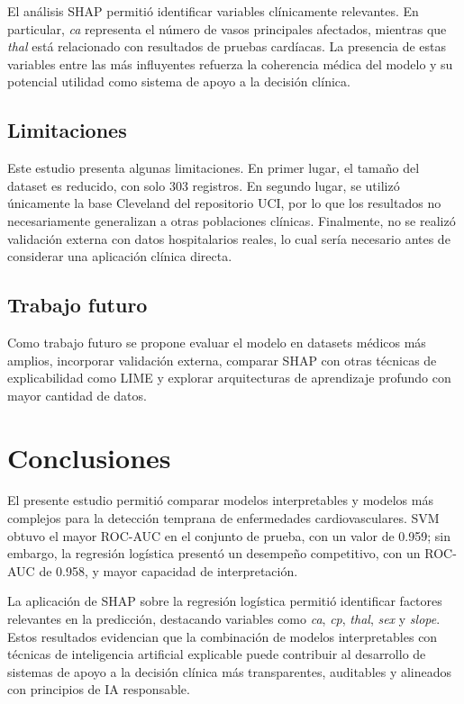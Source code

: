 \documentclass[conference]{IEEEtran}
\begin{document}
El análisis SHAP permitió identificar variables clínicamente relevantes. En particular, \textit{ca} representa el número de vasos principales afectados, mientras que \textit{thal} está relacionado con resultados de pruebas cardíacas. La presencia de estas variables entre las más influyentes refuerza la coherencia médica del modelo y su potencial utilidad como sistema de apoyo a la decisión clínica.

\subsection{Limitaciones}

Este estudio presenta algunas limitaciones. En primer lugar, el tamaño del dataset es reducido, con solo 303 registros. En segundo lugar, se utilizó únicamente la base Cleveland del repositorio UCI, por lo que los resultados no necesariamente generalizan a otras poblaciones clínicas. Finalmente, no se realizó validación externa con datos hospitalarios reales, lo cual sería necesario antes de considerar una aplicación clínica directa.

\subsection{Trabajo futuro}

Como trabajo futuro se propone evaluar el modelo en datasets médicos más amplios, incorporar validación externa, comparar SHAP con otras técnicas de explicabilidad como LIME y explorar arquitecturas de aprendizaje profundo con mayor cantidad de datos.

\section{Conclusiones}

El presente estudio permitió comparar modelos interpretables y modelos más complejos para la detección temprana de enfermedades cardiovasculares. SVM obtuvo el mayor ROC-AUC en el conjunto de prueba, con un valor de 0.959; sin embargo, la regresión logística presentó un desempeño competitivo, con un ROC-AUC de 0.958, y mayor capacidad de interpretación.

La aplicación de SHAP sobre la regresión logística permitió identificar factores relevantes en la predicción, destacando variables como \textit{ca}, \textit{cp}, \textit{thal}, \textit{sex} y \textit{slope}. Estos resultados evidencian que la combinación de modelos interpretables con técnicas de inteligencia artificial explicable puede contribuir al desarrollo de sistemas de apoyo a la decisión clínica más transparentes, auditables y alineados con principios de IA responsable.
\end{document}
